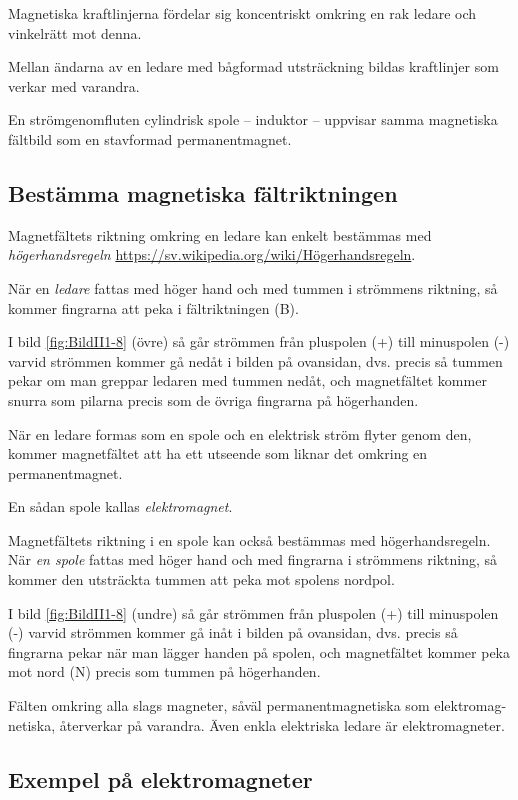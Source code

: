 Magnetiska kraftlinjerna fördelar sig koncentriskt omkring en rak ledare och
vinkelrätt mot denna.

Mellan ändarna av en ledare med bågformad utsträckning bildas kraftlinjer som
verkar med varandra.

En strömgenomfluten cylindrisk spole -- induktor -- uppvisar samma magnetiska
fältbild som en stavformad permanentmagnet.

\subsection{Bestämma magnetiska fältriktningen}

Magnetfältets riktning omkring en ledare kan enkelt bestämmas med
\emph{högerhandsregeln}
\url{https://sv.wikipedia.org/wiki/Högerhandsregeln}.

När en \emph{ledare} fattas med höger hand och med tummen i strömmens
riktning, så kommer fingrarna att peka i fältriktningen (B).

I bild \ref{fig:BildII1-8} (övre) så går strömmen från pluspolen (+) till
minuspolen (-) varvid strömmen kommer gå nedåt i bilden på ovansidan,
dvs. precis så tummen pekar om man greppar ledaren med tummen nedåt, och
magnetfältet kommer snurra som pilarna precis som de övriga fingrarna på
högerhanden.

När en ledare formas som en spole och en elektrisk ström flyter genom den,
kommer magnetfältet att ha ett utseende som liknar det omkring en
permanentmagnet.

En sådan spole kallas \emph{elektromagnet}.

Magnetfältets riktning i en spole kan också bestämmas med högerhandsregeln.
När \emph{en spole} fattas med höger hand och med fingrarna i strömmens
riktning, så kommer den utsträckta tummen att peka mot spolens nordpol.

I bild \ref{fig:BildII1-8} (undre) så går strömmen från pluspolen (+) till minuspolen
(-) varvid strömmen kommer gå inåt i bilden på ovansidan, dvs. precis så
fingrarna pekar när man lägger handen på spolen, och magnetfältet kommer peka
mot nord (N) precis som tummen på högerhanden.

Fälten omkring alla slags magneter, såväl permanentmagnetiska som elektromag-
netiska, återverkar på varandra. Även enkla
elektriska ledare är elektromagneter.

\clearpage

\subsection{Exempel på elektromagneter}

